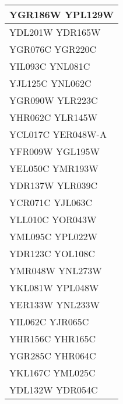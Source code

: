 \begin{longtable}{| m{27em} |}
\hline
YGR186W YPL129W \\
\hline
YDL201W YDR165W \\
\hline
YGR076C YGR220C \\
\hline
YIL093C YNL081C \\
\hline
YJL125C YNL062C \\
\hline
YGR090W YLR223C \\
\hline
YHR062C YLR145W \\
\hline
YCL017C YER048W-A \\
\hline
YFR009W YGL195W \\
\hline
YEL050C YMR193W \\
\hline
YDR137W YLR039C \\
\hline
YCR071C YJL063C \\
\hline
YLL010C YOR043W \\
\hline
YML095C YPL022W \\
\hline
YDR123C YOL108C \\
\hline
YMR048W YNL273W \\
\hline
YKL081W YPL048W \\
\hline
YER133W YNL233W \\
\hline
YIL062C YJR065C \\
\hline
YHR156C YHR165C \\
\hline
YGR285C YHR064C \\
\hline
YKL167C YML025C \\
\hline
YDL132W YDR054C \\
\hline
\end{longtable}